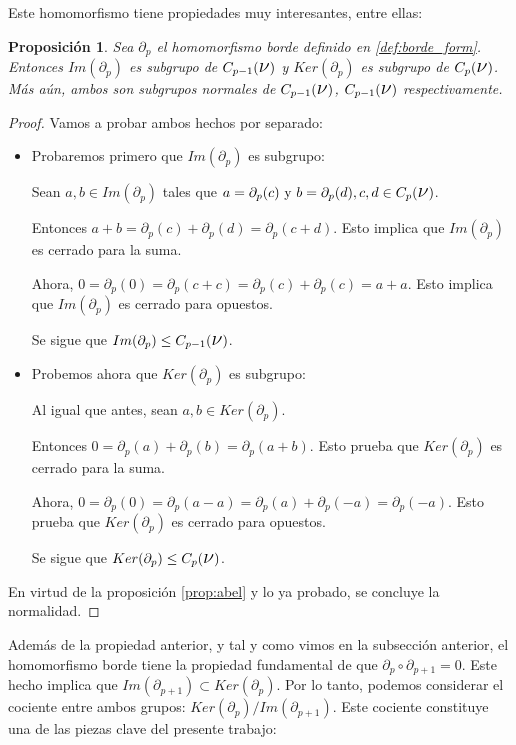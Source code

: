 \documentclass[12pt, a4paper]{article}
\numberwithin{equation}{section}
\theoremstyle{definition}
\theoremstyle{remark}
\theoremstyle{plain}
\newtheorem{prop}{Proposición}
\begin{document}
	Este homomorfismo tiene propiedades muy interesantes, entre ellas:

	\begin{prop}
		Sea $\partial_{p}$ el homomorfismo borde definido en 
	   	\ref{def:borde_form}. Entonces $Im(\partial_{p})$ es subgrupo 
		de $C_{p-1}(\text{{\Large $\nu$}})$ y $Ker(\partial_{p})$ es 
		subgrupo de $C_{p}(\text{{\Large $\nu$}})$. Más aún, ambos son
		subgrupos normales de $C_{p-1}(\text{{\Large $\nu$}})$, 
		$C_{p-1}(\text{{\Large $\nu$}})$ respectivamente.
	\end{prop}
	\begin{proof}
		Vamos a probar ambos hechos por separado:
		\begin{itemize}
			\item Probaremos primero que $Im(\partial_{p})$ es subgrupo:

			Sean $a,b \in Im(\partial_{p})$ tales que $a=\partial_{p}(c) 
			\text{ y } b=\partial_{p}(d), c,d \in 
			C_{p}(\text{{\Large $\nu$}})$. 

			Entonces $a+b=\partial_{p}(c)+\partial_{p}(d)=
			\partial_{p}(c+d)$. Esto implica que $Im(\partial_{p})$ es 
			cerrado para la suma.

			Ahora, $0=\partial_{p}(0)=\partial_{p}(c+c)=
			\partial_{p}(c)+\partial_{p}(c)=a+a$. Esto implica que 
			$Im(\partial_{p})$ es cerrado para opuestos.

			Se sigue que $Im(\partial_{p})\leq 
			C_{p-1}(\text{{\Large $\nu$}})$.
			
			\item Probemos ahora que $Ker(\partial_{p})$ es 
			subgrupo: 
				
			Al igual que antes, sean $a,b \in Ker(\partial_{p})$.

			Entonces $0=\partial_{p}(a)+\partial_{p}(b)=
			\partial_{p}(a+b)$. Esto prueba que 
			$Ker(\partial_{p})$ es cerrado para la suma.

			Ahora, $0=\partial_{p}(0)=\partial_{p}(a-a)=
			\partial_{p}(a)+\partial_{p}(-a)=\partial_{p}(-a)$. 
			Esto prueba que $Ker(\partial_{p})$ es cerrado para 
			opuestos.

			Se sigue que $Ker(\partial_{p})\leq 
			C_{p}(\text{{\Large $\nu$}})$.
		\end{itemize}
		En virtud de la proposición \ref{prop:abel} y lo ya probado, 
		se concluye la normalidad.
	\end{proof}

	

	Además de la propiedad anterior, y tal y como vimos en la subsección 
	anterior, el homomorfismo borde tiene la propiedad fundamental de que 
	$\partial_{p}\circ \partial_{p+1}=0$. Este hecho implica que 
	$Im(\partial_{p+1}) \subset Ker(\partial_{p})$. Por lo tanto, podemos 
	considerar el cociente entre ambos grupos: $Ker(\partial_{p})/
	Im(\partial_{p+1})$. Este cociente constituye una de las piezas clave
	del presente trabajo:
\end{document}
